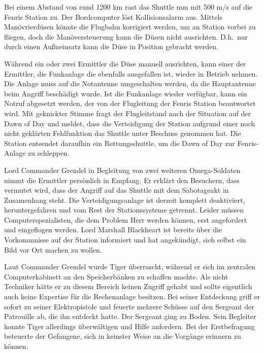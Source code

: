Bei einem Abstand von rund 1200 km rast das Shuttle nun mit 500 m/s auf die Fenris Station zu. Der Bordcomputer löst Kollisionsalarm aus. Mittels Manövrierdüsen könnte die Flugbahn korrigiert werden, um an Station vorbei zu fliegen, doch die Manöversteuerung kann die Düsen nicht ausrichten. D.h.~nur durch einen Außneinsatz kann die Düse in Position gebracht werden.

Während ein oder zwei Ermittler die Düse manuell ausrichten, kann einer der Ermittler, die Funkanlage die ebenfalls ausgefallen ist, wieder in Betrieb nehmen. Die Anlage muss auf die Notantenne umgeschalten werden, da die Hauptantenne beim Angriff beschädigt wurde. Ist die Funkanlage wieder verfügbar, kann ein Notruf abgesetzt werden, der von der Flugleitung der Fenris Station beantwortet wird. Mit geknickter Stimme fragt der Flugleitstand nach der Situation auf der Dawn of Day und meldet, dass die Verteidigung der Station aufgrund einer noch nicht geklärten Fehlfunktion das Shuttle unter Beschuss genommen hat. Die Station entsendet daraufhin ein Rettungsshuttle, um die Dawn of Day zur Fenris-Anlage zu schleppen.

Lord Commander Grendel in Begleitung von zwei weiteren Omega-Soldaten nimmt die Ermittler persönlich in Empfang. Er erklärt den Besuchern, dass vermutet wird, dass der Angriff auf das Shuttle mit dem Sabotageakt in Zusamenhang steht. Die Verteidigungsanlage ist derzeit komplett deaktiviert, heruntergefahren und vom Rest der Stationssysteme getrennt. Leider müssen Computerspezialisten, die dem Problem Herr werden können, erst angefordert und eingeflogen werden. Lord Marshall Blackheart ist bereits über die Vorkommnisse auf der Station informiert und hat angekündigt, sich selbst ein Bild vor Ort machen zu wollen.

Laut Commander Grendel wurde Tiger überrascht, während er sich im zentralen Computerkabinett an den Speicherbänken zu schaffen machte. Als nicht Techniker hätte er zu diesem Bereich keinen Zugriff gehabt und sollte eigentlich auch  keine Expertise für die Rechenanlage besitzen. Bei seiner Entdeckung griff er sofort zu seiner Elektropistole und feuerte mehrere Schüsse auf den Sergeant der Patrouille ab, die ihn entdeckt hatte. Der Sergeant ging zu Boden. Sein Begleiter konnte Tiger allerdings überwältigen und Hilfe anfordern. Bei der Erstbefragung beteuerte der Gefangene, sich in keinster Weise an die Vorgänge erinnern zu können.


